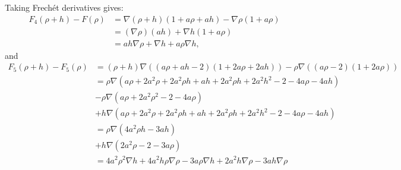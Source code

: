 \documentclass[11pt, a4paper]{article}
\theoremstyle{definition}
\begin{document}
Taking Frech\'et derivatives gives:
\begin{align*}
F_4(\rho+h) - F(\rho) &= \nabla(\rho+h) (1 + a\rho + ah) - \nabla \rho (1 + a \rho)\\
&=(\nabla \rho)(ah) + \nabla h (1 + a \rho)\\
&= ah \nabla \rho + \nabla h + a \rho \nabla h, 
\end{align*}
and
\begin{align*}
F_5(\rho+ h)- F_5(\rho) &= (\rho + h) \nabla \left((a \rho + a h - 2) ( 1 + 2a \rho + 2 a h)\right) - \rho \nabla \left((a \rho - 2)(1 + 2a \rho)\right)\\&= 
\rho \nabla (a \rho + 2a^2 \rho + 2 a^2 \rho h + ah + 2a^2\rho h + 2 a^2 h^2 -2 -4a \rho - 4ah)\\
&- \rho \nabla( a\rho + 2a^2 \rho^2 -2 -4a\rho)\\
&+h \nabla (a \rho + 2a^2 \rho + 2 a^2 \rho h + ah + 2a^2\rho h + 2 a^2 h^2 -2 -4a \rho - 4ah)\\
&= \rho \nabla \left(4a^2 \rho h -3ah \right)\\
&+h \nabla \left( 2a^2 \rho -2 -3a \rho\right)\\
&= 4a^2 \rho^2 \nabla h + 4a^2 h \rho \nabla \rho - 3a \rho \nabla h + 2a^2 h \nabla \rho - 3a h \nabla \rho
\end{align*}
\end{document}
